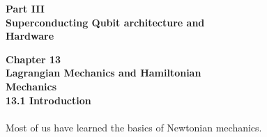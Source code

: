 \documentclass{article}
\begin{document}
\medskip

\begin{flushright}
\textbf{\LARGE Part III\\
Superconducting Qubit architecture and\\
Hardware}
\end{flushright}

\newpage
\noindent
\textbf{\Large Chapter 13\\
Lagrangian Mechanics and Hamiltonian\\
Mechanics}
\\[30pt]
\textbf{\large 13.1 Introduction}
\\\\
Most of us have learned the basics of Newtonian mechanics.
\end{document}
